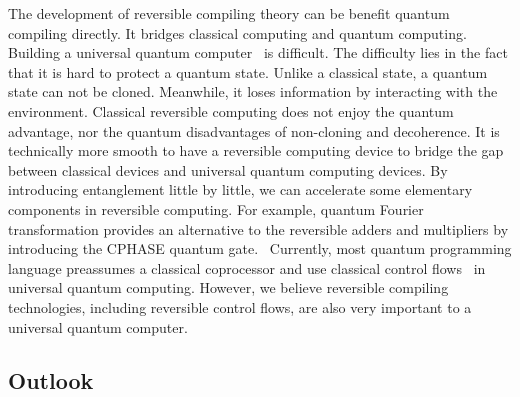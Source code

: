 \documentclass[aps,twocolumn,longbibliography,english,superscriptaddress]{revtex4-1}
\newcommand{\<}{\langle}
\renewcommand{\>}{\rangle}
\theoremstyle{definition}\newtheorem{definition}{\textit{Definition}}
\begin{document}
The development of reversible compiling theory can be benefit quantum compiling directly.
It bridges classical computing and quantum computing.
Building a universal quantum computer~\cite{Nielsen2002} is difficult. 
The difficulty lies in the fact that it is hard to protect a quantum state.
Unlike a classical state, a quantum state can not be cloned. Meanwhile, it loses information by interacting with the environment.
Classical reversible computing does not enjoy the quantum advantage, nor the quantum disadvantages of non-cloning and decoherence.
It is technically more smooth to have a reversible computing device to bridge the gap between classical devices and universal quantum computing devices.
By introducing entanglement little by little, we can accelerate some elementary components in reversible computing. For example, quantum Fourier transformation provides an alternative to the reversible adders and multipliers by introducing the CPHASE quantum gate.~\cite{RuizPerez2017}
Currently, most quantum programming language preassumes a classical coprocessor and use classical control flows~\cite{Svore2018} in universal quantum computing.
However, we believe reversible compiling technologies, including reversible control flows, are also very important to a universal quantum computer.

\subsection{Outlook}\label{sec:outlook}
\end{document}
